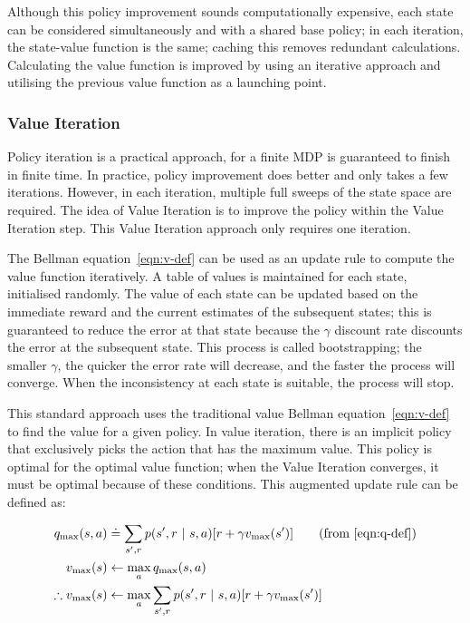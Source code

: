 \documentclass[]{final_report}
\begin{document}
Although this policy improvement sounds computationally expensive, each state can be considered simultaneously and with a shared base policy; in each iteration, the state-value function is the same; caching this removes redundant calculations. Calculating the value function is improved by using an iterative approach and utilising the previous value function as a launching point.  


\subsubsection{Value Iteration}

Policy iteration is a practical approach, for a finite MDP is guaranteed to finish in finite time. In practice, policy improvement does better and only takes a few iterations. However, in each iteration, multiple full sweeps of the state space are required. The idea of Value Iteration is to improve the policy within the Value Iteration step. This Value Iteration approach only requires one iteration. 

The Bellman equation~\ref{eqn:v-def} can be used as an update rule to compute the value function iteratively. A table of values is maintained for each state, initialised randomly. The value of each state can be updated based on the immediate reward and the current estimates of the subsequent states; this is guaranteed to reduce the error at that state because the $\gamma$ discount rate discounts the error at the subsequent state. This process is called bootstrapping; the smaller $\gamma$, the quicker the error rate will decrease, and the faster the process will converge. When the inconsistency at each state is suitable, the process will stop. 

This standard approach uses the traditional value Bellman equation~\ref{eqn:v-def} to find the value for a given policy. In value iteration, there is an implicit policy that exclusively picks the action that has the maximum value. This policy is optimal for the optimal value function; when the Value Iteration converges, it must be optimal because of these conditions. This augmented update rule can be defined as:

\begin{align}
  q_{\text{max}}(s,a)          & \doteq \sum_{s',r}p(s',r\ |\ s, a)[r + \gamma v_{\text{max}}(s')] \tag{from~\ref{eqn:q-def}} \\
  v_{\text{max}}(s)            & \leftarrow  \max_a q_{\text{max}}(s,a) \label{eqn:v-update}                                  \\
  \therefore v_{\text{max}}(s) & \leftarrow  \max_a \sum_{s',r}p(s',r\ |\ s, a)[r + \gamma v_{\text{max}}(s')]
\end{align}
\end{document}
